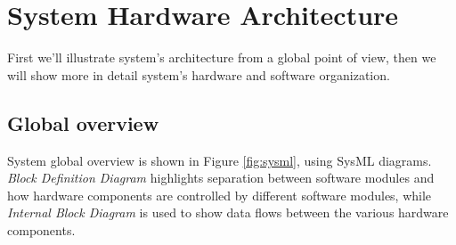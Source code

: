 \chapter{System Hardware Architecture}

First we'll illustrate system's architecture from a global point of view, then we will show more in detail system's hardware and software organization.

\section{Global overview}

System global overview is shown in Figure \ref{fig:sysml}, using SysML diagrams. {\em Block Definition Diagram} highlights separation between software modules and how hardware components are controlled by different software modules, while {\em Internal Block Diagram} is used to show data flows between the various hardware components.

